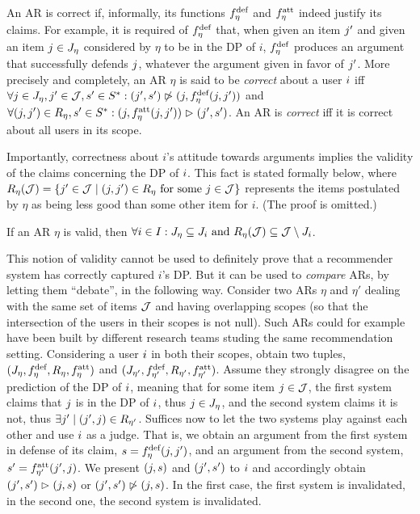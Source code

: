 \documentclass[version=3.21, pagesize, twoside=off, bibliography=totoc, DIV=calc, fontsize=12pt, a4paper, french, english]{scrartcl}
\begin{document}
An \ac{AR} is correct if, informally, its functions $\mdef$ and $\matt$ indeed justify its claims. For example, it is required of $\mdef$ that, when given an item $\itm'$ and given an item $\itm \in \mitems$ considered by $\eta$ to be in the \ac{DP} of $i$, $\mdef$ produces an argument that successfully defends $\itm$, whatever the argument given in favor of $\itm'$. More precisely and completely, an \ac{AR} $\eta$ is said to be \emph{correct} about a user $\usr$ iff $\forall \itm \in \mitems, \itm' \in \allitems, \ar' \in \allargs: (\itm', \ar') \nibeats (\itm, \mdef(\itm, \itm'))$ and $\forall (\itm, \itm') \in R_\eta, \ar' \in \allargs: (\itm, \matt(\itm, \itm')) \ibeats (\itm', \ar')$. An \ac{AR} is \emph{correct} iff it is correct about all users in its scope. 

Importantly, correctness about $i$’s attitude towards arguments implies the validity of the claims concerning the \ac{DP} of $\usr$. This fact is stated formally below, where $R_\eta(\allitems) = \set{\itm' \in \allitems \suchthat (\itm, \itm') \in R_\eta \text{ for some } \itm \in \allitems}$ represents the items postulated by $\eta$ as being less good than some other item for $i$. (The proof is omitted.)
\begin{theorem}
	If an \ac{AR} $\eta$ is valid, then $\forall \usr \in \allusers: \mitems \subseteq \uitems \text{ and } R_\eta(\allitems) \subseteq \allitems \setminus \uitems$.
\end{theorem}

	This notion of validity cannot be used to definitely prove that a recommender system has correctly captured $i$’s \ac{DP}. But it can be used to \emph{compare} \acp{AR}, by letting them “debate”, in the following way. Consider two \acp{AR} $\eta$ and $\eta'$ dealing with the same set of items $\allitems$ and having overlapping scopes (so that the intersection of the users in their scopes is not null). Such \acp{AR} could for example have been built by different research teams studing the same recommendation setting. Considering a user $\usr$ in both their scopes, obtain two tuples, $(\mitems, \mdef, R_\eta, \matt)$ and $(\mitems[\eta'], \mdef[\eta'], R_{\eta'}, \matt[\eta'])$. Assume they strongly disagree on the prediction of the \ac{DP} of $\usr$, meaning that for some item $\itm \in \allitems$, the first system claims that $\itm$ is in the \ac{DP} of $\usr$, thus $\itm \in \mitems$, and the second system claims it is not, thus $\exists \itm' \suchthat (\itm', \itm) \in R_{\eta'}$. Suffices now to let the two systems play against each other and use $\usr$ as a judge. That is, we obtain an argument from the first system in defense of its claim, $\ar = \mdef(\itm, \itm')$, and an argument from the second system, $\ar' = \matt[\eta'](\itm', \itm)$. We present $(\itm, \ar)$ and $(\itm', \ar')$ to $\usr$ and accordingly obtain $(\itm', \ar') \ibeats (\itm, \ar)$ or $(\itm', \ar') \nibeats (\itm, \ar)$. In the first case, the first system is invalidated, in the second one, the second system is invalidated.
\end{document}

